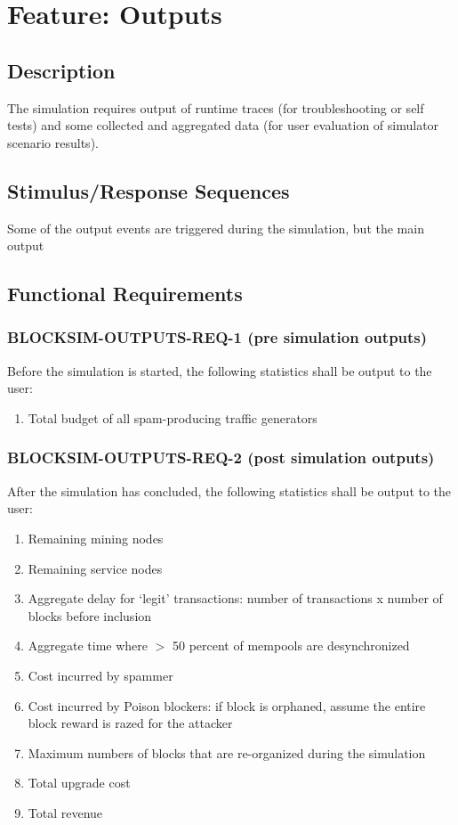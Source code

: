 \documentclass{scrreprt}
\begin{document}
\section{Feature: Outputs}

\subsection{Description}

The simulation requires output of runtime traces (for troubleshooting or
self tests) and some collected and aggregated data (for user evaluation of
simulator scenario results).


\subsection{Stimulus/Response Sequences}

Some of the output events are triggered during the simulation, but the
main output


\subsection{Functional Requirements}


\subsubsection{BLOCKSIM-OUTPUTS-REQ-1 (pre simulation outputs)}

Before the simulation is started, the following statistics shall be output
to the user:

\begin{enumerate}
   \item Total budget of all spam-producing traffic generators
\end{enumerate}


\subsubsection{BLOCKSIM-OUTPUTS-REQ-2 (post simulation outputs)}

After the simulation has concluded, the following statistics shall be output
to the user:

\begin{enumerate}
   \item Remaining mining nodes
   \item Remaining service nodes
   \item Aggregate delay for `legit' transactions: number of transactions x number of blocks before inclusion
   \item Aggregate time where $>$ 50 percent of mempools are desynchronized
   \item Cost incurred by spammer
   \item Cost incurred by Poison blockers: if block is orphaned, assume the entire block reward is razed for the attacker
   \item Maximum numbers of blocks that are re-organized during the simulation
   \item Total upgrade cost
   \item Total revenue
\end{enumerate}
\end{document}
